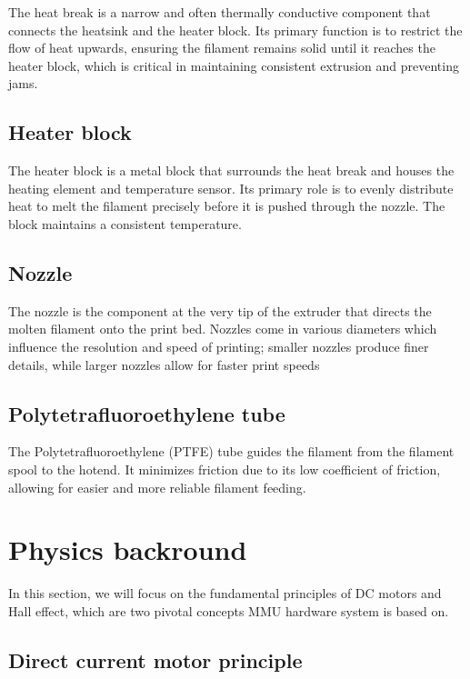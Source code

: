 The heat break is a narrow and often thermally conductive component that connects the heatsink and the heater block. Its primary function is to restrict the flow of heat upwards, ensuring the filament remains solid until it reaches the heater block, which is critical in maintaining consistent extrusion and preventing jams.

\subsection{Heater block}

The heater block is a metal block that surrounds the heat break and houses the heating element and temperature sensor. Its primary role is to evenly distribute heat to melt the filament precisely before it is pushed through the nozzle. The block maintains a consistent temperature.

\subsection{Nozzle}

The nozzle is the component at the very tip of the extruder that directs the molten filament onto the print bed. Nozzles come in various diameters which influence the resolution and speed of printing; smaller nozzles produce finer details, while larger nozzles allow for faster print speeds

\subsection{Polytetrafluoroethylene tube}

The Polytetrafluoroethylene (PTFE) tube \cite{ptfe} guides the filament from the filament spool to the hotend. It minimizes friction due to its low coefficient of friction, allowing for easier and more reliable filament feeding.

\section{Physics backround}

In this section, we will focus on the fundamental principles of DC motors and Hall effect, which are two pivotal concepts MMU hardware system is based on. 

\subsection{Direct current motor principle}


